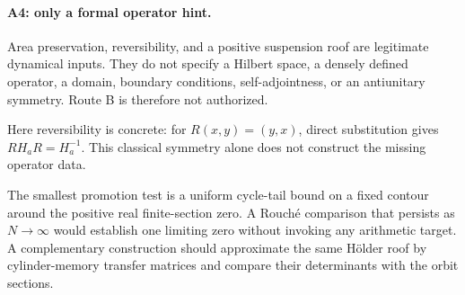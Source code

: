 \paragraph{A4: only a formal operator hint.}
Area preservation, reversibility, and a positive suspension roof are legitimate
dynamical inputs.  They do not specify a Hilbert space, a densely defined
operator, a domain, boundary conditions, self-adjointness, or an antiunitary
symmetry.  Route B is therefore not authorized.

Here reversibility is concrete: for \(R(x,y)=(y,x)\), direct substitution gives
\(R H_a R=H_a^{-1}\).  This classical symmetry alone does not construct the
missing operator data.

The smallest promotion test is a uniform cycle-tail bound on a fixed contour
around the positive real finite-section zero.  A Rouch\'e comparison that
persists as \(N\to\infty\) would establish one limiting zero without invoking
any arithmetic target.  A complementary construction should approximate the
same H\"older roof by cylinder-memory transfer matrices and compare their
determinants with the orbit sections.
